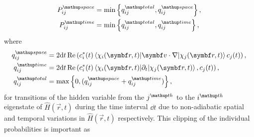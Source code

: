 \begin{align}
P^\up{space}_{ij} &= \min\left\{q^\up{total}_{ij}, q^\up{space}_{ij}\right\},\\
P^\up{time}_{ij} &= \min\left\{q^\up{total}_{ij}, q^\up{time}_{ij}\right\},
\end{align}
where
\begin{align}
q^\up{space}_{ij} &= 2\dd t\re\left(c_i^*(t)
\matrixel{\chi_i(\vec r, t)}{\vec v\cdot\nabla}{\chi_j(\vec r, t)}
 c_j(t)\right),\\
q^\up{time}_{ij} &= 2\dd t\re\left(c_i^*(t)
\matrixel{\chi_i(\vec r, t)}{\partial_t}{\chi_j(\vec r, t)},
 c_j(t)\right),\\
q^\up{total}_{ij} &= \max\left\{0, (q^\up{space}_{ij} + q^\up{time}_{ij})\right\},
\end{align}
for transitions of the hidden variable from the $j^\up{th}$ to the $i^\up{th}$ eigenstate of $\hat H(\vec r, t)$ during the time interval $\dd t$ due to non-adiabatic spatial and temporal variations in $\hat H(\vec r, t)$ respectively. This clipping of the individual probabilities is important as 

